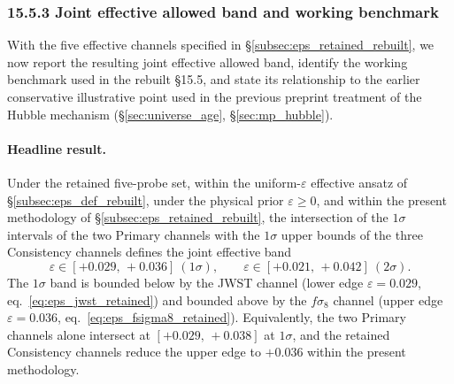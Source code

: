 %
%
%

\subsubsection*{\normalfont\textbf{15.5.3 \quad Joint effective allowed band and working benchmark}}
\label{subsec:eps_joint_band_rebuilt}

With the five effective channels specified in
\S\ref{subsec:eps_retained_rebuilt}, we now report the resulting joint
effective allowed band, identify the working benchmark used in the
rebuilt \S15.5, and state its relationship to the earlier conservative
illustrative point used in the previous preprint treatment of the
Hubble mechanism
(\S\ref{sec:universe_age}, \S\ref{sec:mp_hubble}).

\paragraph{Headline result.}
Under the retained five-probe set, within the uniform-$\varepsilon$
effective ansatz of \S\ref{subsec:eps_def_rebuilt}, under the physical
prior $\varepsilon \geq 0$, and within the present methodology of
\S\ref{subsec:eps_retained_rebuilt}, the intersection of the $1\sigma$
intervals of the two Primary channels with the $1\sigma$ upper bounds
of the three Consistency channels defines the joint effective band
\begin{equation}
  \varepsilon \in [+0.029,\,+0.036]\ (1\sigma),
  \qquad
  \varepsilon \in [+0.021,\,+0.042]\ (2\sigma).
  \label{eq:eps_joint_band_rebuilt}
\end{equation}
The $1\sigma$ band is bounded below by the JWST channel (lower edge
$\varepsilon = 0.029$, eq.~\eqref{eq:eps_jwst_retained}) and bounded
above by the $f\sigma_8$ channel (upper edge $\varepsilon = 0.036$,
eq.~\eqref{eq:eps_fsigma8_retained}). Equivalently, the two Primary
channels alone intersect at $[+0.029,\,+0.038]$ at $1\sigma$, and the
retained Consistency channels reduce the upper edge to $+0.036$ within
the present methodology.

